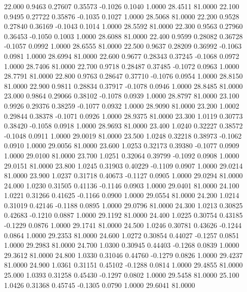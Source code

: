   22.000   0.9463   0.27607   0.35573  -0.1026   0.1040   1.0000  28.4511  81.0000
  22.100   0.9495   0.27722   0.35876  -0.1035   0.1027   1.0000  28.5068  81.0000
  22.200   0.9528   0.27840   0.36169  -0.1043   0.1014   1.0000  28.5592  81.0000
  22.300   0.9563   0.27960   0.36453  -0.1050   0.1003   1.0000  28.6088  81.0000
  22.400   0.9599   0.28082   0.36728  -0.1057   0.0992   1.0000  28.6555  81.0000
  22.500   0.9637   0.28209   0.36992  -0.1063   0.0981   1.0000  28.6994  81.0000
  22.600   0.9677   0.28343   0.37245  -0.1068   0.0972   1.0000  28.7406  81.0000
  22.700   0.9718   0.28487   0.37485  -0.1072   0.0963   1.0000  28.7791  81.0000
  22.800   0.9763   0.28647   0.37710  -0.1076   0.0954   1.0000  28.8150  81.0000
  22.900   0.9811   0.28834   0.37917  -0.1078   0.0946   1.0000  28.8485  81.0000
  23.000   0.9864   0.29066   0.38102  -0.1078   0.0939   1.0000  28.8797  81.0000
  23.100   0.9926   0.29376   0.38259  -0.1077   0.0932   1.0000  28.9090  81.0000
  23.200   1.0002   0.29844   0.38378  -0.1071   0.0926   1.0000  28.9375  81.0000
  23.300   1.0119   0.30773   0.38420  -0.1058   0.0918   1.0000  28.9693  81.0000
  23.400   1.0240   0.32227   0.38572  -0.1048   0.0911   1.0000  29.0019  81.0000
  23.500   1.0248   0.32218   0.38973  -0.1062   0.0910   1.0000  29.0056  81.0000
  23.600   1.0253   0.32173   0.39380  -0.1077   0.0909   1.0000  29.0100  81.0000
  23.700   1.0251   0.32064   0.39799  -0.1092   0.0908   1.0000  29.0151  81.0000
  23.800   1.0245   0.31903   0.40229  -0.1109   0.0907   1.0000  29.0214  81.0000
  23.900   1.0237   0.31718   0.40673  -0.1127   0.0905   1.0000  29.0294  81.0000
  24.000   1.0230   0.31505   0.41136  -0.1146   0.0903   1.0000  29.0401  81.0000
  24.100   1.0221   0.31266   0.41625  -0.1166   0.0900   1.0000  29.0554  81.0000
  24.200   1.0214   0.31019   0.42146  -0.1188   0.0895   1.0000  29.0796  81.0000
  24.300   1.0213   0.30825   0.42683  -0.1210   0.0887   1.0000  29.1192  81.0000
  24.400   1.0225   0.30754   0.43185  -0.1229   0.0876   1.0000  29.1741  81.0000
  24.500   1.0246   0.30781   0.43626  -0.1244   0.0864   1.0000  29.2353  81.0000
  24.600   1.0272   0.30854   0.44027  -0.1257   0.0851   1.0000  29.2983  81.0000
  24.700   1.0300   0.30945   0.44403  -0.1268   0.0839   1.0000  29.3612  81.0000
  24.800   1.0330   0.31046   0.44760  -0.1279   0.0826   1.0000  29.4237  81.0000
  24.900   1.0361   0.31151   0.45102  -0.1288   0.0814   1.0000  29.4855  81.0000
  25.000   1.0393   0.31258   0.45430  -0.1297   0.0802   1.0000  29.5458  81.0000
  25.100   1.0426   0.31368   0.45745  -0.1305   0.0790   1.0000  29.6041  81.0000
